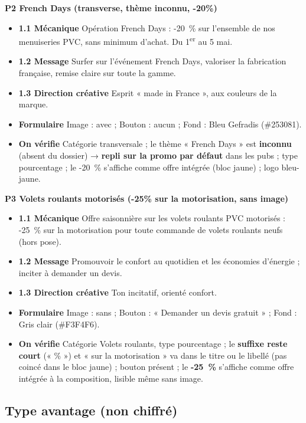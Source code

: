 \documentclass[11pt,a4paper]{article}
\begin{document}
\textbf{P2 \textbullet{} French Days (transverse, thème inconnu, -20\%)}
\begin{itemize}[leftmargin=1.4em]
  \item \textbf{1.1 Mécanique} Opération French Days : -20~\% sur l'ensemble de nos
        menuiseries PVC, sans minimum d'achat. Du 1\textsuperscript{er} au 5 mai.
  \item \textbf{1.2 Message} Surfer sur l'événement French Days, valoriser la fabrication
        française, remise claire sur toute la gamme.
  \item \textbf{1.3 Direction créative} Esprit « made in France », aux couleurs de la marque.
  \item \textbf{Formulaire} Image : avec ; Bouton : aucun ; Fond : Bleu Gefradis (\#253081).
  \item \textbf{On vérifie} Catégorie transversale ; le thème « French Days » est
        \textbf{inconnu} (absent du dossier) → \textbf{repli sur la promo par défaut} dans
        les pubs ; type pourcentage ; le -20~\% s'affiche comme offre intégrée (bloc jaune) ;
        logo bleu-jaune.
\end{itemize}

\textbf{P3 \textbullet{} Volets roulants motorisés (-25\% sur la motorisation, sans image)}
\begin{itemize}[leftmargin=1.4em]
  \item \textbf{1.1 Mécanique} Offre saisonnière sur les volets roulants PVC motorisés :
        -25~\% sur la motorisation pour toute commande de volets roulants neufs (hors pose).
  \item \textbf{1.2 Message} Promouvoir le confort au quotidien et les économies d'énergie ;
        inciter à demander un devis.
  \item \textbf{1.3 Direction créative} Ton incitatif, orienté confort.
  \item \textbf{Formulaire} Image : sans ; Bouton : « Demander un devis gratuit » ; Fond :
        Gris clair (\#F3F4F6).
  \item \textbf{On vérifie} Catégorie Volets roulants, type pourcentage ; le \textbf{suffixe
        reste court} (« \% ») et « sur la motorisation » va dans le titre ou le libellé (pas
        coincé dans le bloc jaune) ; bouton présent ; le \textbf{-25~\%} s'affiche comme offre
        intégrée à la composition, lisible même sans image.
\end{itemize}

\subsection{Type avantage (non chiffré)}
\end{document}
